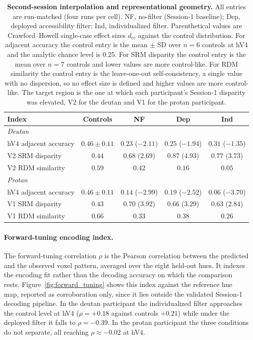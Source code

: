 \begin{table}[tb]
  \centering
  \caption{\textbf{Second-session interpolation and representational geometry.} All entries are run-matched (four runs per cell). NF, no-filter (Session-1 baseline); Dep, deployed accessibility filter; Ind, individualized filter. Parenthetical values are Crawford--Howell single-case effect sizes $d_{cc}$ against the control distribution. For adjacent accuracy the control entry is the mean $\pm$ SD over $n = 6$ controls at hV4 and the analytic chance level is $0.25$. For SRM disparity the control entry is the mean over $n = 7$ controls and lower values are more control-like. For RDM similarity the control entry is the leave-one-out self-consistency, a single value with no dispersion, so no effect size is defined and higher values are more control-like. The target region is the one at which each participant's Session-1 disparity was elevated, V2 for the deutan and V1 for the protan participant.}
  \label{tab:exp2_geometry}
  \small
  \begin{tabular}{lcccc}
    \toprule
    Index & Controls & NF & Dep & Ind \\
    \midrule
    \multicolumn{5}{l}{\emph{Deutan}} \\
    \quad hV4 adjacent accuracy & $0.46 \pm 0.11$ & $0.23$ ($-2.11$) & $0.25$ ($-1.94$) & $0.31$ ($-1.35$) \\
    \quad V2 SRM disparity & $0.44$ & $0.68$ ($2.69$) & $0.87$ ($4.93$) & $0.77$ ($3.73$) \\
    \quad V2 RDM similarity & $0.59$ & $0.42$ & $0.16$ & $0.05$ \\
    \midrule
    \multicolumn{5}{l}{\emph{Protan}} \\
    \quad hV4 adjacent accuracy & $0.46 \pm 0.11$ & $0.14$ ($-2.99$) & $0.19$ ($-2.52$) & $0.06$ ($-3.70$) \\
    \quad V1 SRM disparity & $0.43$ & $0.70$ ($3.92$) & $0.66$ ($3.29$) & $0.63$ ($2.84$) \\
    \quad V1 RDM similarity & $0.66$ & $0.33$ & $0.38$ & $0.26$ \\
    \bottomrule
  \end{tabular}
\end{table}

\paragraph{Forward-tuning encoding index.}
The forward-tuning correlation $\rho$ is the Pearson correlation between the predicted and the observed voxel pattern, averaged over the eight held-out hues. It indexes the encoding fit rather than the decoding accuracy on which the comparison rests. Figure~\ref{fig:forward_tuning} shows this index against the reference hue map, reported as corroboration only, since it lies outside the validated Session-1 decoding pipeline. In the deutan participant the individualized filter approaches the control level at hV4 ($\rho = +0.18$ against controls $+0.21$) while under the deployed filter it falls to $\rho = -0.39$. In the protan participant the three conditions do not separate, all reaching $\rho \approx -0.02$ at hV4.

